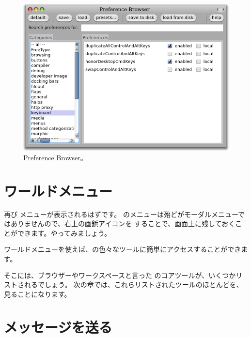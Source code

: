 \documentclass[a4paper,10pt,twoside]{book}
\begin{document}
\begin{figure}[htb]
\centerline{\includegraphics[width=\textwidth]{PreferenceBrowser}}
\caption{Preference Browser。}
\end{figure}


\section{ワールドメニュー}

再び  メニューが表示されるはずです。
\pharo のメニューは殆どがモーダルメニューではありませんので、右上の画鋲アイコンを \click することで、画面上に残しておくことができます。やってみましょう。

ワールドメニューを使えば、\pharo の色々なツールに簡単にアクセスすることができます。


そこには、ブラウザーやワークスペースと言った \pharo のコアツールが、いくつかリストされるでしょう。
次の章では、これらリストされたツールのほとんどを、見ることになります。

\section{メッセージを送る}
\end{document}
